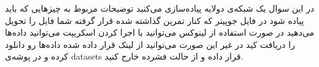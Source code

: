 در این سوال یک شبکه‌ی دولایه پیاده‌سازی می‌کنید توضیحات مربوط به چیز‌هایی که باید پیاده شود در فایل جوپیتر که کنار تمرین گذاشته شده قرار گرفته شما فایل  را تحویل می‌دهید در صورت استفاده از لینوکس می‌توانید با اجرا کردن اسکریپت  می‌توانید داده‌ها را دریافت کید در غیر این صورت می‌توانید از لینک قرار داده شده داده‌ها رو دانلود کرده و در پوشه‌ی datasets قرار داده و از حالت فشرده خارج کنید.